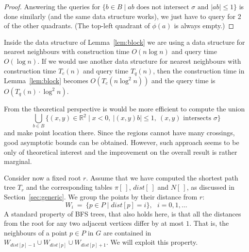 \documentclass[a4paper,USenglish]{lipics}
\newcommand{\RR}{\ensuremath{\mathbb R}}  %
\def\dist{\mathit{dist}}
\let\le\leqslant
\begin{document}
\begin{proof}
	Answering the queries for 
	$\{ b\in B \mid \text{$ab$ does not intersect $\sigma$ and $|ab|\le 1$}\}$
	is done similarly (and the same data structure works), we just have
	to query for 2 of the other quadrants. 
	(The top-left quadrant of $\phi(a)$ is always empty.)
\end{proof}

Inside the data structure of Lemma~\ref{lem:block} we are using a data structure
for nearest neighbours with construction time $O(n\log n)$ and query time $O(\log n)$.
If we would use another data structure for nearest neighbours with construction
time $T_c(n)$ and query time $T_q(n)$, then the construction time 
in Lemma~\ref{lem:block} becomes $O(T_c(n\log^2 n))$ and the query time is
$O(T_q(n)\cdot \log^2 n)$.

From the theoretical perspective is would be more efficient to compute the union
\[
	\bigcup_{b\in B} \{ (x,y)\in \RR^2\mid x<0,~ |(x,y)b|\le 1,~ (x,y) 
			\text{ intersects } \sigma \}
\]
and make point location there. Since the regions cannot have many crossings,
good asymptotic bounds can be obtained. However, such approach seems to be 
only of theoretical interest and the improvement on the overall result
is rather marginal.

Consider now a fixed root $r$. Assume that we have computed 
the shortest path tree $T_r$ and the corresponding tables $\pi[~]$, $\dist[~]$ and $N[~]$,
as discussed in Section~\ref{sec:generic}.
We group the points by their distance from $r$:
\[
	W_i ~=~ \{ p\in P \mid \dist[p]=i \},~~~ i=0,1,\dots
\]
A standard property of BFS trees, that also holds here,
is that all the distances from the root for any two adjacent vertices differ by at most $1$.
That is, the neighbours of a point $p\in P$ in $G$ are contained in
$W_{\dist[p]-1}\cup W_{\dist[p]} \cup W_{\dist[p]+1}$.
We will exploit this property.
\end{document}
